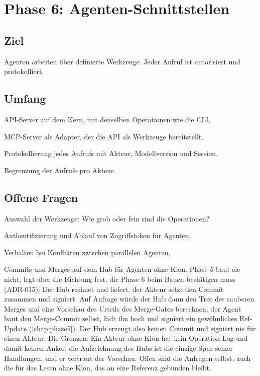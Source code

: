 \chapter[chap:phase6]{Phase 6: Agenten-Schnittstellen}

\section{Ziel}

Agenten arbeiten über definierte Werkzeuge. Jeder Aufruf ist autorisiert und protokolliert.

\section{Umfang}

\startitemize
\item API-Server auf dem Kern, mit denselben Operationen wie die CLI.
\item MCP-Server als Adapter, der die API als Werkzeuge bereitstellt.
\item Protokollierung jedes Aufrufs mit Akteur, Modellversion und Session.
\item Begrenzung der Aufrufe pro Akteur.
\stopitemize

\section{Offene Fragen}

\startitemize
\item Auswahl der Werkzeuge: Wie grob oder fein sind die Operationen?
\item Authentifizierung und Ablauf von Zugriffstoken für Agenten.
\item Verhalten bei Konflikten zwischen parallelen Agenten.
\item Commits und Merges auf dem Hub für Agenten ohne Klon.
Phase 5 baut sie nicht, legt aber die Richtung fest, die Phase 6 beim Bauen bestätigen muss
(ADR-015): Der Hub rechnet und liefert, der Akteur setzt den Commit zusammen und signiert.
Auf Anfrage würde der Hub dann den Tree des sauberen Merges und eine Vorschau des Urteils des
Merge-Gates berechnen; der Agent baut den Merge-Commit selbst, lädt ihn hoch und signiert ein
gewöhnliches Ref-Update ([chap:phase5]).
Der Hub erzeugt also keinen Commit und signiert nie für einen Akteur.
Die Grenzen: Ein Akteur ohne Klon hat kein Operation Log und damit keinen Anker, die Aufzeichnung
des Hubs ist die einzige Spur seiner Handlungen, und er vertraut der Vorschau.
Offen sind die Anfragen selbst, auch die für das Lesen ohne Klon, das an eine Referenz gebunden
bleibt.
\stopitemize

